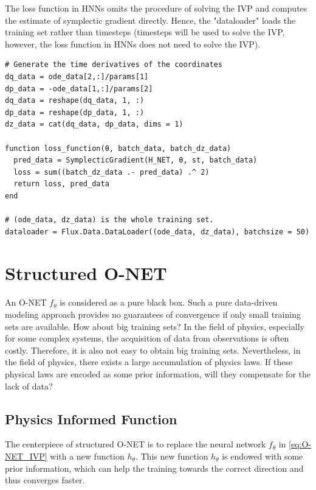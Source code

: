 \documentclass[
	parskip, 			   %
	twoside, 			   %
	DIV=14, 			   %
	BCOR=15.0mm, 		   %
	headsepline, 		   %
	open=right, 		   %
	captions=tableheading, %
	bibliography=totoc,    %
	numbers=noenddot       %
]{scrreprt}
\begin{document}
The loss function in HNNs omits the procedure of solving the IVP and computes the estimate of symplectic gradient directly. Hence, the "dataloader" loads the training set rather than timesteps (timesteps will be used to solve the IVP, however, the loss function in HNNs does not need to solve the IVP).

\begin{verbatim}
# Generate the time derivatives of the coordinates
dq_data = ode_data[2,:]/params[1]
dp_data = -ode_data[1,:]/params[2]
dq_data = reshape(dq_data, 1, :)
dp_data = reshape(dp_data, 1, :)
dz_data = cat(dq_data, dp_data, dims = 1)

function loss_function(θ, batch_data, batch_dz_data)
  pred_data = SymplecticGradient(H_NET, θ, st, batch_data)
  loss = sum((batch_dz_data .- pred_data) .^ 2)
  return loss, pred_data
end

# (ode_data, dz_data) is the whole training set.
dataloader = Flux.Data.DataLoader((ode_data, dz_data), batchsize = 50)
\end{verbatim}

\section{Structured O-NET}
An O-NET $f_{\theta}$ is considered as a pure black box. Such a pure data-driven modeling approach provides no guarantees of convergence if only small training sets are available. How about big training sets? In the field of physics, especially for some complex systems, the acquisition of data from observations is often costly. Therefore, it is also not easy to obtain big training sets. Nevertheless, in the field of physics, there exists a large accumulation of physics laws. If these physical laws are encoded as some prior information, will they compensate for the lack of data?

\subsection{Physics Informed Function}

The centerpiece of structured O-NET is to replace the neural network $f_{\theta}$ in \ref{eq:O-NET_IVP} with a new function $h_{\theta}$. This new function $h_{\theta}$ is endowed with some prior information, which can help the training towards the correct direction and thus converges faster.
\end{document}
